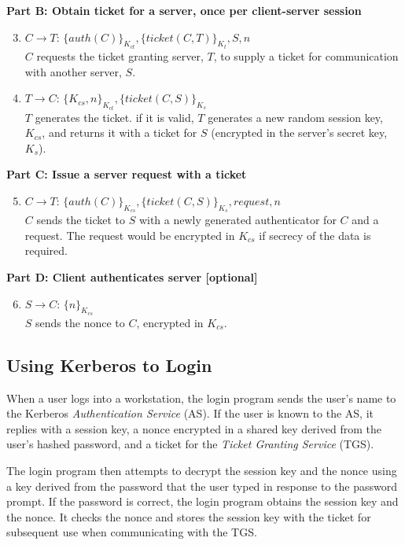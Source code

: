 \textbf{Part B: Obtain ticket for a server, once per client-server session}
\begin{enumerate}
    \setcounter{enumi}{2}
    \item $C \rightarrow T$: $\{auth(C)\}_{K_{ct}}, \{ticket(C,T)\}_{K_{t}}, S, n$\\
    $C$ requests the ticket granting server, $T$, to supply a ticket for communication with another server, $S$.
    \item $T \rightarrow C$: $\{K_{cs}, n\}_{K_{ct}}, \{ticket(C,S)\}_{K_{s}}$\\
    $T$ generates the ticket. if it is valid, $T$ generates a new random session key, $K_{cs}$, and returns it with a ticket for $S$ (encrypted in the server's secret key, $K_s$). 
\end{enumerate}

\textbf{Part C: Issue a server request with a ticket}
\begin{enumerate}
    \setcounter{enumi}{4}
    \item $C \rightarrow T$: $\{auth(C)\}_{K_{cs}}, \{ticket(C,S)\}_{K_{s}}, request, n$\\
    $C$ sends the ticket to $S$ with a newly generated authenticator for $C$ and a request. The request would be encrypted in $K_{cs}$ if secrecy of the data is required.
\end{enumerate}

\textbf{Part D: Client authenticates server [optional]}
\begin{enumerate}
    \setcounter{enumi}{5}
    \item $S \rightarrow C$: $\{n\}_{K_{cs}}$\\
    $S$ sends the nonce to $C$, encrypted in $K_{cs}$. 
\end{enumerate}

\subsection{Using Kerberos to Login}
When a user logs into a workstation, the login program sends the user's name to the Kerberos \textit{Authentication Service} (AS). If the user is known to the AS, it replies with a session key, a nonce encrypted in a shared key derived from the user's hashed password, and a ticket for the \textit{Ticket Granting Service} (TGS).

The login program then attempts to decrypt the session key and the nonce using a key derived from the password that the user typed in response to the password prompt. If the password is correct, the login program obtains the session key and the nonce. It checks the nonce and stores the session key with the ticket for subsequent use when communicating with the TGS.

